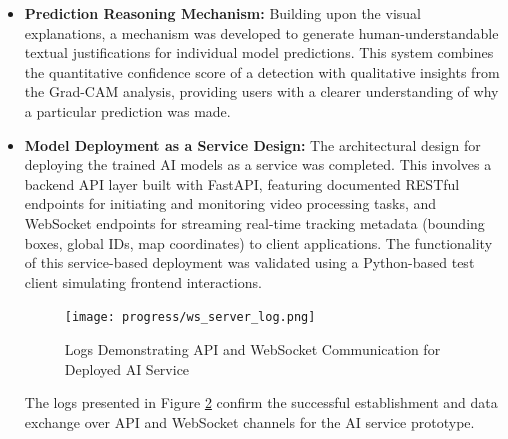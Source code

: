 \begin{itemize}
    \begin{figure}[!htb]
        \centering
        \texttt{[image: progress/gradcam\_example.png]}
        \caption{Example of Grad-CAM Visualization for Person Detection}
        \label{fig:progress_gradcam_example}
    \end{figure}
    
    Figure \ref{fig:progress_gradcam_example} provides a visual example of how Grad-CAM highlights influential image regions for a person detection, aiding in understanding the model's focus.

    \item \textbf{Prediction Reasoning Mechanism:} Building upon the visual explanations, a mechanism was developed to generate human-understandable textual justifications for individual model predictions. This system combines the quantitative confidence score of a detection with qualitative insights from the Grad-CAM analysis, providing users with a clearer understanding of why a particular prediction was made.

    \item \textbf{Model Deployment as a Service Design:} The architectural design for deploying the trained AI models as a service was completed. This involves a backend API layer built with FastAPI, featuring documented RESTful endpoints for initiating and monitoring video processing tasks, and WebSocket endpoints for streaming real-time tracking metadata (bounding boxes, global IDs, map coordinates) to client applications. The functionality of this service-based deployment was validated using a Python-based test client simulating frontend interactions.
    
    \begin{figure}[!htb]
        \centering
        \texttt{[image: progress/ws\_server\_log.png]}
        \caption{Logs Demonstrating API and WebSocket Communication for Deployed AI Service}
        \label{fig:progress_api_logs}
    \end{figure}
    The logs presented in Figure \ref{fig:progress_api_logs} confirm the successful establishment and data exchange over API and WebSocket channels for the AI service prototype.
\end{itemize}

\clearpage

